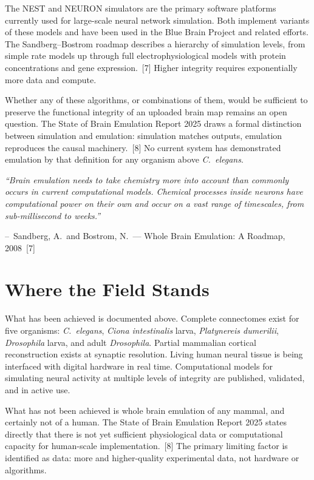 \documentclass[11pt,a4paper]{article}
\renewenvironment{quote}
  {\list{}{\leftmargin=2.2em\rightmargin=2.2em\topsep=0.4em\parsep=0.3em}%
   \item\relax\itshape}
  {\endlist}
\newcommand{\attrib}[1]{\par\vspace{0.2em}\normalfont\small\hspace*{0em}--\ #1\par}
\begin{document}
The NEST and NEURON simulators are the primary software platforms currently used for large-scale neural network simulation. Both implement variants of these models and have been used in the Blue Brain Project and related efforts. The Sandberg--Bostrom roadmap describes a hierarchy of simulation levels, from simple rate models up through full electrophysiological models with protein concentrations and gene expression.~[7] Higher integrity requires exponentially more data and compute.

Whether any of these algorithms, or combinations of them, would be sufficient to preserve the functional integrity of an uploaded brain map remains an open question. The State of Brain Emulation Report 2025 draws a formal distinction between simulation and emulation: simulation matches outputs, emulation reproduces the causal machinery.~[8] No current system has demonstrated emulation by that definition for any organism above \textit{C.~elegans}.

\begin{quote}
``Brain emulation needs to take chemistry more into account than commonly occurs in current computational models. Chemical processes inside neurons have computational power on their own and occur on a vast range of timescales, from sub-millisecond to weeks.''
\attrib{Sandberg, A.\ and Bostrom, N.\ --- Whole Brain Emulation: A Roadmap, 2008~[7]}
\end{quote}

\section{Where the Field Stands}

What has been achieved is documented above. Complete connectomes exist for five organisms: \textit{C.~elegans}, \textit{Ciona intestinalis} larva, \textit{Platynereis dumerilii}, \textit{Drosophila} larva, and adult \textit{Drosophila}. Partial mammalian cortical reconstruction exists at synaptic resolution. Living human neural tissue is being interfaced with digital hardware in real time. Computational models for simulating neural activity at multiple levels of integrity are published, validated, and in active use.

What has not been achieved is whole brain emulation of any mammal, and certainly not of a human. The State of Brain Emulation Report 2025 states directly that there is not yet sufficient physiological data or computational capacity for human-scale implementation.~[8] The primary limiting factor is identified as data: more and higher-quality experimental data, not hardware or algorithms.
\end{document}
